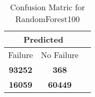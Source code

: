 \begin{table}[] 
\caption{Confusion Matric for RandomForest100} 
\label{Table: Prediction Accuracy-DMDRandomForest100OnlySunEKF-ignoreReflectionEKF-top2perfectNoFailurePrediction-Reflection} 
\centering 
\begin{tabular} 
 {@{}ccc@{}} 
\toprule 
\multicolumn{2}{c}{\textbf{Predicted}}
 \\ \midrule 
\multicolumn{1}{|c|}{Failure} & 
\multicolumn{1}{c|}{No Failure}
 \\ \midrule 
\multicolumn{1}{|c|}{\color{green}\textbf{93252}} & 
\multicolumn{1}{c|}{\color{red}\textbf{368}}
 \\ \midrule 
\multicolumn{1}{|c|}{\color{red}\textbf{16059}} & 
\multicolumn{1}{c|}{\color{green}\textbf{60449}}
 \\ \bottomrule 
\end{tabular} 
\end{table} 

